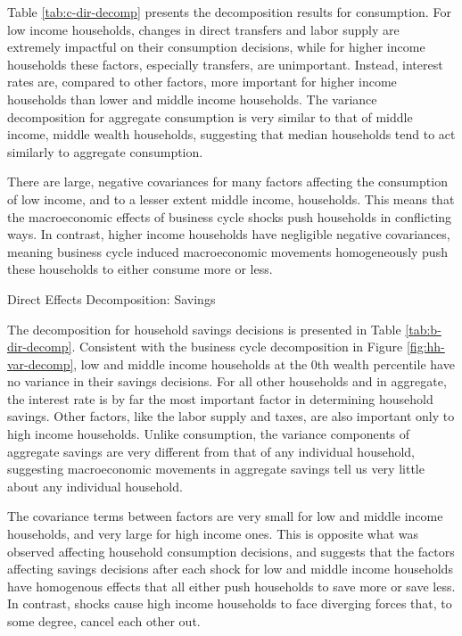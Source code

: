 Table \ref{tab:c-dir-decomp} presents the decomposition results for consumption. For low income households, changes in direct transfers and labor supply are extremely impactful on their consumption decisions, while for higher income households these factors, especially transfers, are unimportant. Instead, interest rates are, compared to other factors, more important for higher income households than lower and middle income households. The variance decomposition for aggregate consumption is very similar to that of middle income, middle wealth households, suggesting that median households tend to act similarly to aggregate consumption.

There are large, negative covariances for many factors affecting the consumption of low income, and to a lesser extent middle income, households. This means that the macroeconomic effects of business cycle shocks push households in conflicting ways. In contrast, higher income households have negligible negative covariances, meaning business cycle induced macroeconomic movements homogeneously push these households to either consume more or less.

\begin{table}[t!]
    \centering
    \caption{Direct Effects Decomposition: Savings}
    
    \label{tab:b-dir-decomp}
\end{table}

The decomposition for household savings decisions is presented in Table \ref{tab:b-dir-decomp}. Consistent with the business cycle decomposition in Figure \ref{fig:hh-var-decomp}, low and middle income households at the 0th wealth percentile have no variance in their savings decisions. For all other households and in aggregate, the interest rate is by far the most important factor in determining household savings. Other factors, like the labor supply and taxes, are also important only to high income households. Unlike consumption, the variance components of aggregate savings are very different from that of any individual household, suggesting macroeconomic movements in aggregate savings tell us very little about any individual household.

The covariance terms between factors are very small for low and middle income households, and very large for high income ones. This is opposite what was observed affecting household consumption decisions, and suggests that the factors affecting savings decisions after each shock for low and middle income households have homogenous effects that all either push households to save more or save less. In contrast, shocks cause high income households to face diverging forces that, to some degree, cancel each other out.
